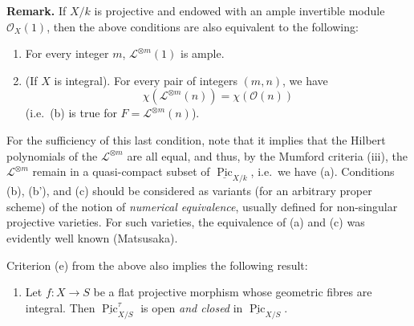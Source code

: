 \documentclass{article}
\providecommand{\tightlist}{%
  \setlength{\itemsep}{0pt}\setlength{\parskip}{0pt}}
\newenvironment{rmenv}[1]
  {\phantomsection\par\smallskip\noindent\textbf{#1.}\rmfamily}
  {\par\smallskip}
\newcommand{\oldpage}[1]{\marginpar{\footnotesize$\Big\vert$ \textit{p.~#1}}}
\theoremstyle{definition}
\theoremstyle{definition}
\theoremstyle{definition}
\theoremstyle{definition}
\theoremstyle{remark}
\begin{document}
\begin{rmenv}{Remark}
If \(X/k\) is projective and endowed with an ample invertible module \({\mathscr{O}}_X(1)\), then the above conditions are also equivalent to the following:

\begin{enumerate}
\def\labelenumi{\alph{enumi}.}
\setcounter{enumi}{3}
\tightlist
\item
  For every integer \(m\), \({\mathscr{L}}^{\otimes m}(1)\) is ample.
\item
  (If \(X\) is integral).
  For every pair of integers \((m,n)\), we have
  \[
   \chi({\mathscr{L}}^{\otimes m}(n))
   = \chi({\mathscr{O}}(n))
      \]
  \oldpage{C-10}(i.e.~(b) is true for \(F={\mathscr{L}}^{\otimes m}(n)\)).
\end{enumerate}

For the sufficiency of this last condition, note that it implies that the Hilbert polynomials of the \({\mathscr{L}}^{\otimes m}\) are all equal, and thus, by the Mumford criteria (iii), the \({\mathscr{L}}^{\otimes m}\) remain in a quasi-compact subset of \(\underline{\operatorname{Pic}}_{X/k}\), i.e.~we have (a).
Conditions (b), (b'), and (c) should be considered as variants (for an arbitrary proper scheme) of the notion of \emph{numerical equivalence}, usually defined for non-singular projective varieties.
For such varieties, the equivalence of (a) and (c) was evidently well known (Matsusaka).

Criterion (e) from the above also implies the following result:

\begin{enumerate}
\def\labelenumi{\roman{enumi}.}
\setcounter{enumi}{8}
\tightlist
\item
  Let \(f\colon X\to S\) be a flat projective morphism whose geometric fibres are integral.
  Then \(\underline{\operatorname{Pic}}_{X/S}^\tau\) is open \emph{and closed} in \(\underline{\operatorname{Pic}}_{X/S}\).
\end{enumerate}


\end{rmenv}
\end{document}
